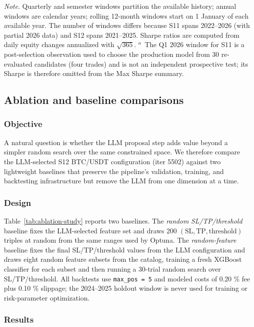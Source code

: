 \documentclass[11pt,a4paper]{article}
\begin{document}
\emph{Note.} Quarterly and semester windows partition the available history; annual windows are calendar years; rolling 12-month windows start on 1 January of each available year. The number of windows differs because S11 spans 2022--2026 (with partial 2026 data) and S12 spans 2021--2025. Sharpe ratios are computed from daily equity changes annualized with \(\sqrt{365}\). $^a$~The Q1 2026 window for S11 is a post-selection observation used to choose the production model from 30 re-evaluated candidates (four trades) and is not an independent prospective test; its Sharpe is therefore omitted from the Max Sharpe summary.

\subsection{Ablation and baseline comparisons}\label{ablation-and-baseline-comparisons}

\subsubsection{Objective}

A natural question is whether the LLM proposal step adds value beyond a simpler random search over the same constrained space. We therefore compare the LLM-selected S12 BTC/USDT configuration (iter 5502) against two lightweight baselines that preserve the pipeline's validation, training, and backtesting infrastructure but remove the LLM from one dimension at a time.

\subsubsection{Design}

Table~\ref{tab:ablation-study} reports two baselines. The \emph{random SL/TP/threshold} baseline fixes the LLM-selected feature set and draws 200 \((\mathrm{SL}, \mathrm{TP}, \mathrm{threshold})\) triples at random from the same ranges used by Optuna. The \emph{random-feature} baseline fixes the final SL/TP/threshold values from the LLM configuration and draws eight random feature subsets from the catalog, training a fresh XGBoost classifier for each subset and then running a 30-trial random search over SL/TP/threshold. All backtests use \texttt{max\_pos\ =\ 5} and modeled costs of 0.20 \% fee plus 0.10 \% slippage; the 2024--2025 holdout window is never used for training or risk-parameter optimization.

\subsubsection{Results}
\end{document}
